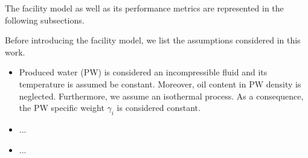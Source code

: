 The facility model as well as its performance metrics are represented in the following subsections.
\par Before introducing the facility model, we list the assumptions considered in this work. 
\begin{itemize}
    \item Produced water (PW) is considered an incompressible fluid and its temperature is assumed be constant. Moreover, oil content in PW density is neglected. Furthermore, we assume an isothermal process. As a consequence, the PW specific weight $\gamma_i$ is considered constant.
    \item ...
    \item ...
\end{itemize}




